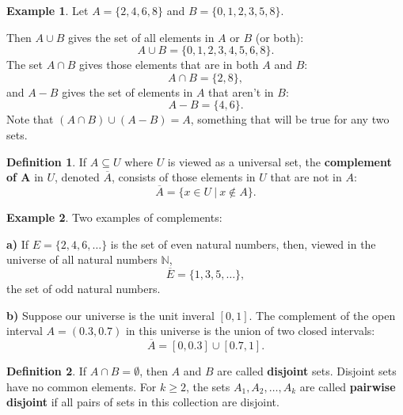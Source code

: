 \documentclass[
]{book}
\theoremstyle{definition}
\newtheorem{definition}{Definition}[chapter]
\theoremstyle{definition}
\newtheorem{example}{Example}[chapter]
\theoremstyle{definition}
\theoremstyle{definition}
\theoremstyle{remark}
\begin{document}
\begin{example}
\protect\hypertarget{exm:set-arithmetic}{}\label{exm:set-arithmetic}Let \(A = \{2,4,6,8\}\) and \(B = \{ 0,1,2,3,5,8\}.\)

Then \(A \cup B\) gives the set of all elements in \(A\) or \(B\) (or both): \[A \cup B = \{0,1,2,3,4,5,6,8 \}.\] The set \(A\cap B\) gives those elements that are in both \(A\) and \(B\): \[A \cap B = \{2,8 \},\]
and \(A - B\) gives the set of elements in \(A\) that aren't in \(B\):
\[A - B = \{4,6\}.\]
Note that \((A \cap B) \cup (A - B) = A\), something that will be true for any two sets.
\end{example}

\begin{definition}
\protect\hypertarget{def:complement}{}\label{def:complement}If \(A \subseteq U\) where \(U\) is viewed as a universal set, the \textbf{complement of A} in \(U\), denoted \(\overline{A}\), consists of those elements in \(U\) that are not in \(A\): \[\overline{A}=\{x \in U ~|~ x \notin A\}.\]
\end{definition}

\begin{example}
\protect\hypertarget{exm:complement}{}\label{exm:complement}Two examples of complements:

\textbf{a)} If \(E = \{2, 4, 6, \ldots \}\) is the set of even natural numbers, then, viewed in the universe of all natural numbers \(\mathbb{N}\), \[\overline{E} = \{1, 3, 5, \ldots \},\] the set of odd natural numbers.

\textbf{b)} Suppose our universe is the unit inveral \([0,1]\). The complement of the open interval \(A = (0.3,0.7)\) in this universe is the union of two closed intervals: \[\overline{A} = [0,0.3] \cup [0.7,1].\]
\end{example}

\begin{definition}
\protect\hypertarget{def:disjoint-sets}{}\label{def:disjoint-sets}If \(A \cap B = \emptyset\), then \(A\) and \(B\) are called \textbf{disjoint} sets. Disjoint sets have no common elements. For \(k \geq 2\), the sets \(A_1, A_2, \ldots, A_k\) are called \textbf{pairwise disjoint} if all pairs of sets in this collection are disjoint.
\end{definition}
\end{document}
